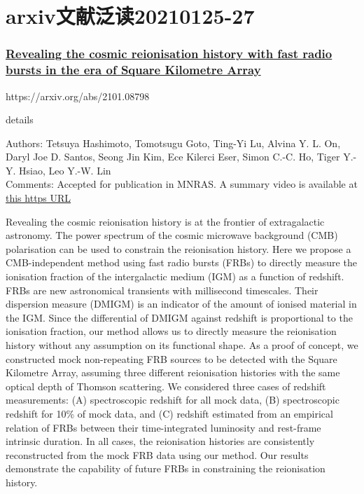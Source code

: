 \documentclass[
]{article}
\author{}
\date{}
\begin{document}
\hypertarget{header-n0}{%
\section{arxiv文献泛读20210125-27}\label{header-n0}}

\hypertarget{header-n2}{%
\subsubsection{\texorpdfstring{\href{./2101.08798.pdf}{Revealing the
cosmic reionisation history with fast radio bursts in the era of Square
Kilometre
Array}}{Revealing the cosmic reionisation history with fast radio bursts in the era of Square Kilometre Array}}\label{header-n2}}

https://arxiv.org/abs/2101.08798

details

Authors: Tetsuya Hashimoto, Tomotsugu Goto, Ting-Yi Lu, Alvina Y. L. On,
Daryl Joe D. Santos, Seong Jin Kim, Ece Kilerci Eser, Simon C.-C. Ho,
Tiger Y.-Y. Hsiao, Leo Y.-W. Lin\\
Comments: Accepted for publication in MNRAS. A summary video is
available at
\href{https://www.youtube.com/watch?v=uis6h_cBnpE\&feature=youtu.be}{this
https URL}

Revealing the cosmic reionisation history is at the frontier of
extragalactic astronomy. The power spectrum of the cosmic microwave
background (CMB) polarisation can be used to constrain the reionisation
history. Here we propose a CMB-independent method using fast radio
bursts (FRBs) to directly measure the ionisation fraction of the
intergalactic medium (IGM) as a function of redshift. FRBs are new
astronomical transients with millisecond timescales. Their dispersion
measure (DMIGM) is an indicator of the amount of ionised material in the
IGM. Since the differential of DMIGM against redshift is proportional to
the ionisation fraction, our method allows us to directly measure the
reionisation history without any assumption on its functional shape. As
a proof of concept, we constructed mock non-repeating FRB sources to be
detected with the Square Kilometre Array, assuming three different
reionisation histories with the same optical depth of Thomson
scattering. We considered three cases of redshift measurements: (A)
spectroscopic redshift for all mock data, (B) spectroscopic redshift for
10\% of mock data, and (C) redshift estimated from an empirical relation
of FRBs between their time-integrated luminosity and rest-frame
intrinsic duration. In all cases, the reionisation histories are
consistently reconstructed from the mock FRB data using our method. Our
results demonstrate the capability of future FRBs in constraining the
reionisation history.
\end{document}
